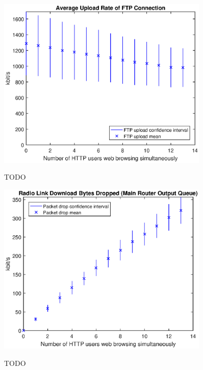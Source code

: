\documentclass[a4paper,10pt]{book}\usepackage{graphicx}
\begin{document}
\begin{figure}[!ht]
  \centering
    \includegraphics[width=0.9\textwidth]{on_ftp_upload.eps}
    \label{fig:on_ftp_upload}
    \caption{TODO}
\end{figure}


\begin{figure}[!ht]
  \centering
    \includegraphics[width=0.9\textwidth]{on_main_router_drops.eps}
    \label{fig:on_main_router_drops}
    \caption{TODO}
\end{figure}
\end{document}
